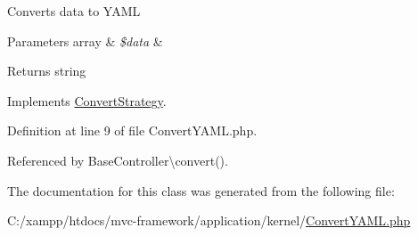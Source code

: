 Converts data to Y\+A\+ML


\begin{DoxyParams}[1]{Parameters}
array & {\em \$data} & \\
\hline
\end{DoxyParams}
\begin{DoxyReturn}{Returns}
string 
\end{DoxyReturn}


Implements \hyperlink{interface_convert_strategy_a41444ea294bbd35a6c07ef4e9faeae10}{Convert\+Strategy}.



Definition at line 9 of file Convert\+Y\+A\+M\+L.\+php.



Referenced by Base\+Controller\textbackslash{}convert().




The documentation for this class was generated from the following file\+:\begin{DoxyCompactItemize}
\item 
C\+:/xampp/htdocs/mvc-\/framework/application/kernel/\hyperlink{_convert_y_a_m_l_8php}{Convert\+Y\+A\+M\+L.\+php}\end{DoxyCompactItemize}

